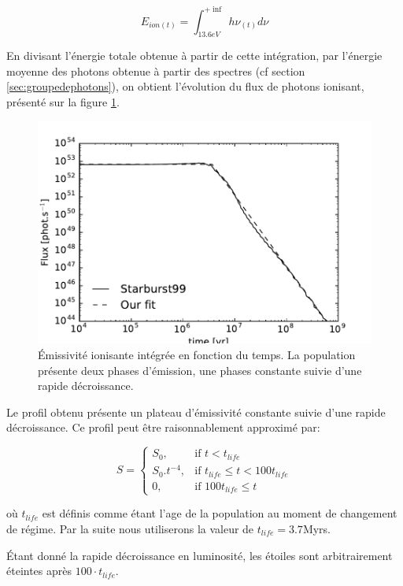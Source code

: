 \begin{equation}
E_{ion (t)} = \int_{13.6eV}^{+\inf} h \nu_{(t)} d\nu
\end{equation}

En divisant l'énergie totale obtenue à partir de cette intégration, par l'énergie moyenne des photons obtenue à partir des spectres (cf section \ref{sec:groupedephotons}), on obtient l'évolution du flux de photons ionisant, présenté sur la figure \ref{fig:flux}.
\begin{figure}
        \includegraphics[width=.95\linewidth]{img/03/flux.pdf} 
        \caption[Émissivité ionisante]{Émissivité ionisante intégrée en fonction du temps.
        La population présente deux phases d'émission, une phases constante suivie d'une rapide décroissance.
 		\label{fig:flux}}
\end{figure}
Le profil obtenu présente un plateau d'émissivité constante suivie d'une rapide décroissance.
Ce profil peut être raisonnablement approximé par:

\begin{equation}
    S = 
\begin{cases}
    S_0 ,         & \text{if } t < t_{life}\\
    S_0.t^{-4},   & \text{if } t_{life} \leq t < 100t_{life} \\
    0,   & \text{if } 100t_{life} \leq t
\end{cases}
\end{equation}

où $t_{life}$ est définis comme étant l'age de la population au moment de changement de régime.
Par la suite nous utiliserons la valeur de $t_{life} = 3.7$Myrs.

Étant donné la rapide décroissance en luminosité, les étoiles sont arbitrairement éteintes après $100 \cdot t_{life}$.

